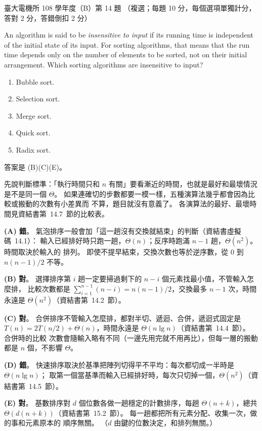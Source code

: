 \begin{pastexam}[label={px:ntu-108-ee-dsb-14}]{臺大電機所 108 學年度（B）第 14 題}
（複選；每題 10 分，每個選項單獨計分，答對 2 分，答錯倒扣 2 分）

An algorithm is said to be \textit{insensitive to input} if its running time is independent of the
initial state of its input. For sorting algorithms, that means that the run time depends only on
the number of elements to be sorted, not on their initial arrangement. Which sorting algorithms
are insensitive to input?
\begin{enumerate}[label=(\Alph*).]
\item Bubble sort.
\item Selection sort.
\item Merge sort.
\item Quick sort.
\item Radix sort.
\end{enumerate}
\end{pastexam}

\begin{pastsoln}
答案是 (B)(C)(E)。

先說判斷標準：「執行時間只和 $n$ 有關」要看漸近的時間，也就是最好和最壞情況是不是同一個
$\Theta$。 如果連確切的步數都要一模一樣，五種演算法幾乎都會因為比較或搬動的次數有小差異而
不算，題目就沒有意義了。 各演算法的最好、最壞時間見資結書第~14.7~節的比較表。

\textbf{(A) 錯}。 氣泡排序一般會加「這一趟沒有交換就結束」的判斷（資結書虛擬碼~14.1）：
輸入已經排好時只跑一趟，$\Theta(n)$；反序時跑滿 $n - 1$ 趟，$\Theta(n^2)$。 時間取決於輸入的
排列。 即使不提早結束，交換次數也等於逆序數，從 $0$ 到 $n(n-1)/2$ 不等。

\textbf{(B) 對}。 選擇排序第 $i$ 趟一定要掃過剩下的 $n - i$ 個元素找最小值，不管輸入怎麼排，
比較次數都是 $\sum_{i=1}^{n-1} (n - i) = n(n-1)/2$，交換最多 $n - 1$ 次，時間永遠是
$\Theta(n^2)$（資結書第~14.2~節）。

\textbf{(C) 對}。 合併排序不管輸入怎麼排，都對半切、遞迴、合併，遞迴式固定是
$T(n) = 2T(n/2) + \Theta(n)$，時間永遠是 $\Theta(n \lg n)$（資結書第~14.4~節）。 合併時的比較
次數會隨輸入略有不同（一邊先用完就不用再比），但每一層的搬動都是 $n$ 個，不影響 $\Theta$。

\textbf{(D) 錯}。 快速排序取決於基準把陣列切得平不平均：每次都切成一半時是 $\Theta(n \lg n)$；
取第一個當基準而輸入已經排好時，每次只切掉一個，$\Theta(n^2)$（資結書第~14.5~節）。

\textbf{(E) 對}。 基數排序對 $d$ 個位數各做一趟穩定的計數排序，每趟 $\Theta(n + k)$，總共
$\Theta(d(n + k))$（資結書第~15.2~節）。 每一趟都把所有元素分配、收集一次，做的事和元素原本的
順序無關。 （$d$ 由鍵的位數決定，和排列無關。）
\end{pastsoln}
